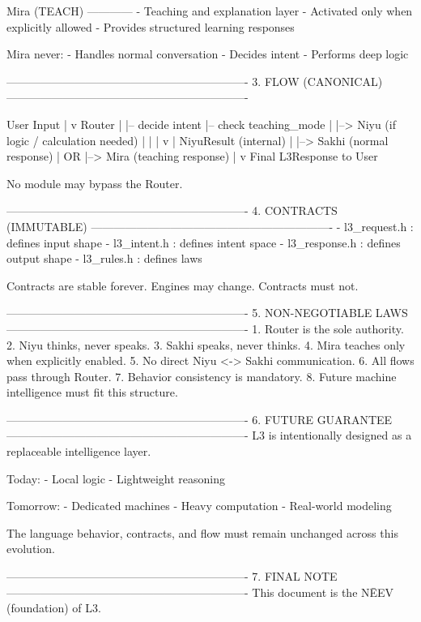 \documentclass{article}
\begin{document}
Mira (TEACH)
------------
- Teaching and explanation layer
- Activated only when explicitly allowed
- Provides structured learning responses

Mira never:
- Handles normal conversation
- Decides intent
- Performs deep logic

----------------------------------------------------------------
3. FLOW (CANONICAL)
----------------------------------------------------------------

User Input
   |
   v
Router
   |
   |-- decide intent
   |-- check teaching_mode
   |
   |--> Niyu (if logic / calculation needed)
   |        |
   |        v
   |   NiyuResult (internal)
   |
   |--> Sakhi (normal response)
   |        OR
   |--> Mira  (teaching response)
   |
   v
Final L3Response to User

No module may bypass the Router.

----------------------------------------------------------------
4. CONTRACTS (IMMUTABLE)
----------------------------------------------------------------
- l3_request.h  : defines input shape
- l3_intent.h   : defines intent space
- l3_response.h : defines output shape
- l3_rules.h    : defines laws

Contracts are stable forever.
Engines may change. Contracts must not.

----------------------------------------------------------------
5. NON-NEGOTIABLE LAWS
----------------------------------------------------------------
1. Router is the sole authority.
2. Niyu thinks, never speaks.
3. Sakhi speaks, never thinks.
4. Mira teaches only when explicitly enabled.
5. No direct Niyu <-> Sakhi communication.
6. All flows pass through Router.
7. Behavior consistency is mandatory.
8. Future machine intelligence must fit this structure.

----------------------------------------------------------------
6. FUTURE GUARANTEE
----------------------------------------------------------------
L3 is intentionally designed as a replaceable intelligence layer.

Today:
- Local logic
- Lightweight reasoning

Tomorrow:
- Dedicated machines
- Heavy computation
- Real-world modeling

The language behavior, contracts, and flow
must remain unchanged across this evolution.

----------------------------------------------------------------
7. FINAL NOTE
----------------------------------------------------------------
This document is the NĒEV (foundation) of L3.
\end{document}
